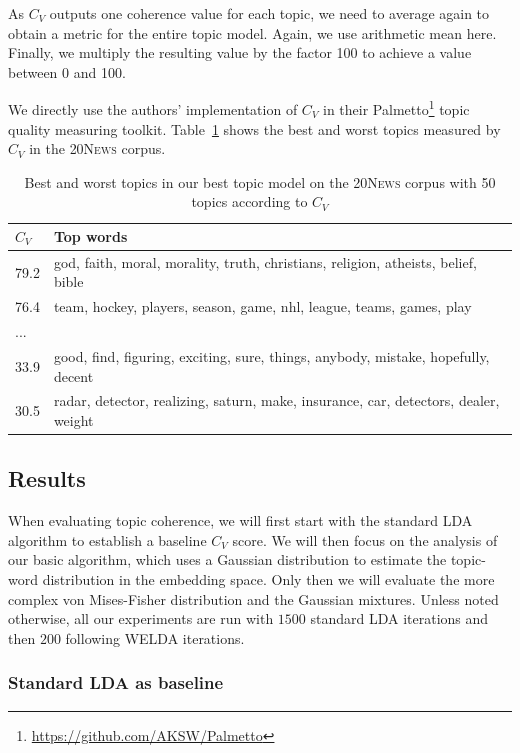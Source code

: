 \documentclass[
        a4paper,
        titlepage,
        twoside,
        parskip,
        numbers=noenddot
        ]{scrbook}
\newcommand{\ra}[1]{\renewcommand{\arraystretch}{#1}}
\theoremstyle{break}
\begin{document}
As $C_V$ outputs one coherence value for each topic, we need to average again to obtain a metric for the entire topic model.
Again, we use arithmetic mean here.
Finally, we multiply the resulting value by the factor 100 to achieve a value between 0 and 100.

\label{sec:tc_setup}
We directly use the authors' implementation of $C_V$ in their Palmetto\footnote{\url{https://github.com/AKSW/Palmetto}} topic quality measuring toolkit.
Table~\ref{table:best_worst_cv_topics} shows the best and worst topics measured by $C_V$ in the \textsc{20News} corpus.
\begin{table}[]
  \ra{1.15}
  \centering
  \caption{Best and worst topics in our best topic model on the \textsc{20News} corpus with 50 topics according to $C_V$}
  \begin{tabular}{ll}
  \toprule
  $C_V$ & Top words \\ \midrule
  79.2               & god, faith, moral, morality, truth, christians, religion, atheists, belief, bible \\
  76.4               & team, hockey, players, season, game, nhl, league, teams, games, play \\
  ...                &                    \\
  33.9               & good, find, figuring, exciting, sure, things, anybody, mistake, hopefully, decent \\
  30.5               & radar, detector, realizing, saturn, make, insurance, car, detectors, dealer, weight \\ \bottomrule
  \end{tabular}
  \label{table:best_worst_cv_topics}
\end{table}

\subsection{Results}

When evaluating topic coherence, we will first start with the standard LDA algorithm to establish a baseline $C_V$ score.
We will then focus on the analysis of our basic algorithm, which uses a Gaussian distribution to estimate the topic-word distribution in the embedding space.
Only then we will evaluate the more complex von Mises-Fisher distribution and the Gaussian mixtures.
Unless noted otherwise, all our experiments are run with $1500$ standard LDA iterations and then $200$ following WELDA iterations.

\subsubsection{Standard LDA as baseline}
\label{sec:lda_as_baseline}
\end{document}
